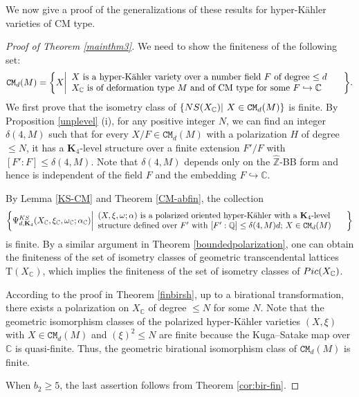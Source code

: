 \documentclass[11pt,reqno,oneside]{amsart}
\numberwithin{equation}{section}
\theoremstyle{definition}
\newcommand{\Pic}{{\rm Pic}}
\newcommand{\KS}{{\rm KS}}
\newcommand{\NS}{{\rm NS}}
\newcommand{\rT}{\mathrm{T}}
\newcommand{\CC}{\mathbb{C}}
\newcommand{\QQ}{\mathbb{Q}}
\newcommand{\ZZ}{\mathbb{Z}}
\begin{document}
We now give a proof of the generalizations of these results for hyper-Kähler varieties of CM type.

\begin{proof}[Proof of Theorem \ref{mainthm3}]
We need to show the finiteness of the following set:
\begin{equation*}
\mathtt{CM}_{d}(M)=\bigg\{ X\bigg|\begin{array}{lr}
	\hbox{\rm  $X$~is a hyper-Kähler variety over a number field $F$ of  degree $\leq d$  } &  \\
	\hbox{\rm   $X_\CC$ is of deformation type $M$ and of CM type for some $F\hookrightarrow \CC$} &
	\end{array}  \bigg \}.
\end{equation*}
We first prove that the isometry class of  $\{ \NS(X_\CC) |~X\in \mathtt{CM}_{d}(M)\}$ is finite. By Proposition \ref{unplevel} (i), for any positive integer $N$, we can find an integer $\delta(4,M)$ such that for every $X/F \in \mathtt{CM}_d(M)$ with a polarization $H$ of degree $\leq N$, it has a $\mathbf{K}_4$-level structure  over a finite extension $F'/F$ with $[F':F]\leq \delta(4,M)$. Note that $\delta(4,M)$
depends only on the $\widehat{\ZZ}$-BB form and hence is independent of the field $F$ and the embedding $F\hookrightarrow \CC$. 


By Lemma \ref{KS-CM} and  Theorem \ref{CM-abfin},  the collection 
\begin{equation}
    \bigg\{ \Psi^{\KS}_{d,\mathbf{K}_4}(X_\CC, \xi_\CC,\omega_{\CC};\alpha_\CC)\bigg|\begin{array}{lr}
	\hbox{\rm  $(X,\xi,\omega;\alpha)$ is a polarized oriented hyper-Kähler with a $\mathbf{K}_{4}$-level  } &  \\
	\hbox{\rm  structure defined over $F'$  with  $[F':\QQ]\leq \delta(4,M)d$; $X\in \mathtt{CM}_{d}(M)$  } &
	\end{array}  \bigg \}
\end{equation}
is finite. By a similar argument in Theorem \ref{boundedpolarization}, one can obtain the finiteness of the set of isometry classes of geometric transcendental lattices $\rT(X_\CC)$, which implies the finiteness of the set of isometry classes of $\Pic(X_\CC)$. 

According to the proof in Theorem \ref{finbirsh}, up to a birational transformation, there exists a polarization on $X_\CC$ of degree $\leq N$ for some $N$.    Note that the geometric isomorphism classes of the polarized hyper-Kähler varieties $(X,\xi)$ with $X\in \mathtt{CM}_d(M)$ and $(\xi)^2\leq N$ are finite because the Kuga--Satake map over $\CC$ is quasi-finite.  Thus, the geometric birational isomorphism class of $\mathtt{CM}_d(M)$ is finite. 

When $b_2\geq 5$, the last assertion follows from Theorem \ref{cor:bir-fin}. 
\end{proof}
\end{document}
